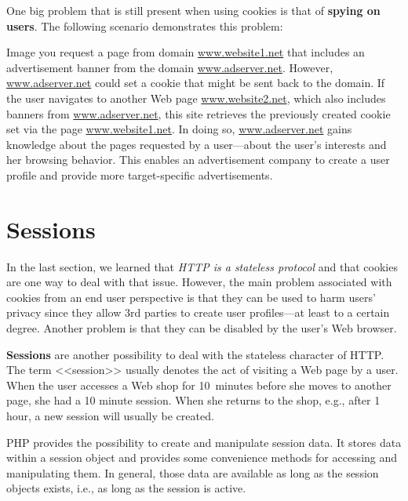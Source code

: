 \documentclass[a4paper, justified, notoc]{tufte-handout} %
\begin{document}
One big problem that is still present when using cookies is that of \textbf{spying on users}. The following scenario demonstrates this problem:
 
Image you request a page from domain \url{www.website1.net} that includes an advertisement banner from the domain \url{www.adserver.net}. However, \url{www.adserver.net} could set a cookie that might be sent back to the domain. 
If the user navigates to another Web page \url{www.website2.net}, which also includes banners from \url{www.adserver.net}, this site retrieves the previously created cookie set via the page \url{www.website1.net}.
In doing so, \url{www.adserver.net} gains knowledge about the pages requested by a user---about the user's interests and her browsing behavior. 
This enables an advertisement company to create a user profile and provide more target-specific advertisements.



\section{Sessions}%
\label{sec:sessions}
In the last section, we learned that \emph{HTTP is a stateless protocol} and that cookies are one way to deal with that issue.
However, the main problem associated with cookies from an end user perspective is that they can be used to harm users' privacy since they allow 3rd parties to create user profiles---at least to a certain degree. Another problem is that they can be disabled by the user's Web browser.

\textbf{Sessions} are another possibility to deal with the stateless character of HTTP. The term <<session>> usually denotes the act of visiting a Web page by a user. %
When the user accesses a Web shop for 10~minutes before she moves to another page, she had a 10 minute session. When she returns to the shop, e.g., after 1 hour, a new session will usually be created.  

PHP provides the possibility to create and manipulate session data. It stores data within a session object and provides some convenience methods for accessing and manipulating them.
In general, those data are available as long as the session objects exists, i.e., as long as the session is active. 
\end{document}
